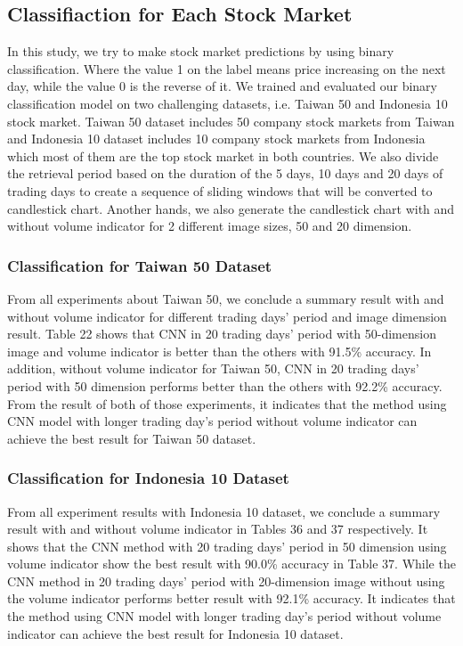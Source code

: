 \documentclass[10pt,twocolumn]{article}
\begin{document}
\subsection{Classifiaction for Each Stock Market}
In this study, we try to make stock market predictions by using binary classification. Where the value 1 on the label means price increasing on the next day, while the value 0 is the reverse of it.
We trained and evaluated our binary classification model on two challenging datasets, i.e. Taiwan 50 and Indonesia 10 stock market. Taiwan 50 dataset includes 50 company stock markets from Taiwan and Indonesia 10 dataset includes 10 company stock markets from Indonesia which most of them are the top stock market in both countries. We also divide the retrieval period based on the duration of the 5 days, 10 days and 20 days of trading days to create a sequence of sliding windows that will be converted to candlestick chart. Another hands, we also generate the candlestick chart with and without volume indicator for 2 different image sizes, 50 and 20 dimension. 
\subsubsection{Classification for Taiwan 50 Dataset}
From all experiments about Taiwan 50, we conclude a summary result with and without volume indicator for different trading days’ period and image dimension result. Table 22 shows that CNN in 20 trading days’ period with 50-dimension image and volume indicator is better than the others with 91.5\% accuracy. In addition, without volume indicator for Taiwan 50, CNN in 20 trading days’ period with 50 dimension performs better than the others with 92.2\% accuracy. From the result of both of those experiments, it indicates that the method using CNN model with longer trading day’s period without volume indicator can achieve the best result for Taiwan 50 dataset.
\subsubsection{Classification for Indonesia 10 Dataset}
From all experiment results with Indonesia 10 dataset, we conclude a summary result with and without volume indicator in Tables 36 and 37 respectively. It shows that the CNN method with 20 trading days’ period in 50 dimension using volume indicator show the best result with 90.0\% accuracy in Table 37. While the CNN method in 20 trading days’ period with 20-dimension image without using the volume indicator performs better result with 92.1\% accuracy. It indicates that the method using CNN model with longer trading day’s period without volume indicator can achieve the best result for Indonesia 10 dataset.
\end{document}
